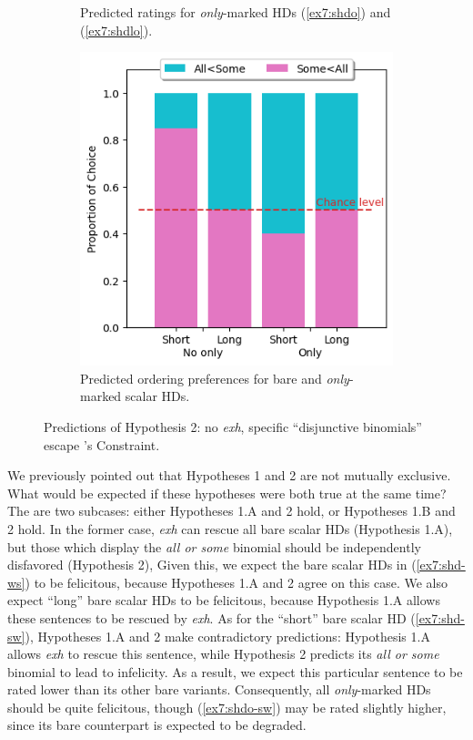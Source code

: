 \begin{figure}[H]
\begin{subfigure}[t]{.32\linewidth}
		\caption[]{Predicted ratings for \textit{only}-marked HDs (\ref{ex7:shdo}) and (\ref{ex7:shdlo}).}
	\end{subfigure}
	\hfill
	\begin{subfigure}[t]{.32\linewidth}
		\centering
		\includegraphics[width=\linewidth]{./pred-2-pref.png}
		\caption[]{Predicted ordering preferences for bare and \textit{only}-marked scalar HDs.}
	\end{subfigure}
	\caption[]{Predictions of Hypothesis 2: no \textit{exh}, specific ``disjunctive binomials'' escape \citeauthor{Hurford1974}'s Constraint.}\label{fig7:predictions-freq}
\end{figure} 

We previously pointed out that Hypotheses 1 and 2 are not mutually exclusive. What would be expected if these hypotheses were both true at the same time? The are two subcases: either Hypotheses 1.A and 2 hold, or Hypotheses 1.B and 2 hold. In the former case, \textit{exh} can rescue all bare scalar HDs (Hypothesis 1.A), but those which display the \textit{all or some} binomial should be independently disfavored (Hypothesis 2), Given this, we expect the bare scalar HDs in (\ref{ex7:shd-ws}) to be felicitous, because Hypotheses 1.A and 2 agree on this case. We also expect ``long'' bare scalar HDs to be felicitous, because Hypothesis 1.A allows these sentences to be rescued by \textit{exh}. As for the ``short'' bare scalar HD (\ref{ex7:shd-sw}), Hypotheses 1.A and 2 make contradictory predictions: Hypothesis 1.A allows \textit{exh} to rescue this sentence, while Hypothesis 2 predicts its \textit{all or some} binomial to lead to infelicity. As a result, we expect this particular sentence to be rated lower than its other bare variants. Consequently, all \textit{only}-marked HDs should be quite felicitous, though (\ref{ex7:shdo-sw}) may be rated slightly higher, since its bare counterpart is expected to be degraded. 

